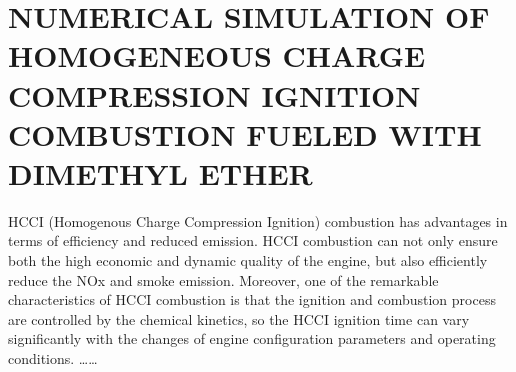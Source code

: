 \fancyhead[RH]{}
\section*{NUMERICAL SIMULATION OF HOMOGENEOUS CHARGE COMPRESSION IGNITION COMBUSTION FUELED WITH DIMETHYL ETHER}%

\hspace{8mm}HCCI (Homogenous Charge Compression Ignition) combustion has advantages in terms of efficiency and reduced emission. HCCI combustion can not only ensure both the high economic and dynamic quality of the engine, but also efficiently reduce the NOx and smoke emission. Moreover, one of the remarkable characteristics of HCCI combustion is that the ignition and combustion process are controlled by the chemical kinetics, so the HCCI ignition time can vary significantly with the changes of engine configuration parameters and operating conditions. ……%

\clearsection